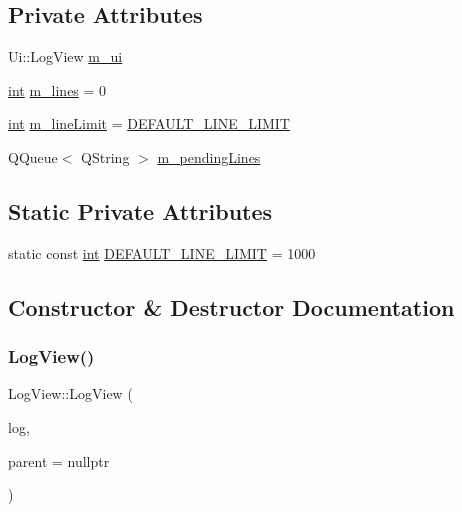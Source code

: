 \subsection*{Private Attributes}
\begin{DoxyCompactItemize}
\item 
Ui\+::\+Log\+View \mbox{\hyperlink{class_q_g_b_a_1_1_log_view_ad14d2319c553761effb0dcfa47ead0b3}{m\+\_\+ui}}
\item 
\mbox{\hyperlink{ioapi_8h_a787fa3cf048117ba7123753c1e74fcd6}{int}} \mbox{\hyperlink{class_q_g_b_a_1_1_log_view_af520c8df95517a41cf269ba91be23a15}{m\+\_\+lines}} = 0
\item 
\mbox{\hyperlink{ioapi_8h_a787fa3cf048117ba7123753c1e74fcd6}{int}} \mbox{\hyperlink{class_q_g_b_a_1_1_log_view_a7500c6dca5556014b72ad664fe8b5700}{m\+\_\+line\+Limit}} = \mbox{\hyperlink{class_q_g_b_a_1_1_log_view_a7bbb7148e2dca4f2ac6b25d8def4b196}{D\+E\+F\+A\+U\+L\+T\+\_\+\+L\+I\+N\+E\+\_\+\+L\+I\+M\+IT}}
\item 
Q\+Queue$<$ Q\+String $>$ \mbox{\hyperlink{class_q_g_b_a_1_1_log_view_a77842da472ca74e8b5b54ea865beaf17}{m\+\_\+pending\+Lines}}
\end{DoxyCompactItemize}
\subsection*{Static Private Attributes}
\begin{DoxyCompactItemize}
\item 
static const \mbox{\hyperlink{ioapi_8h_a787fa3cf048117ba7123753c1e74fcd6}{int}} \mbox{\hyperlink{class_q_g_b_a_1_1_log_view_a7bbb7148e2dca4f2ac6b25d8def4b196}{D\+E\+F\+A\+U\+L\+T\+\_\+\+L\+I\+N\+E\+\_\+\+L\+I\+M\+IT}} = 1000
\end{DoxyCompactItemize}


\subsection{Constructor \& Destructor Documentation}
\mbox{\label{class_q_g_b_a_1_1_log_view_a7bccf99af2ec77e478716a72b8b790e5}} 
\subsubsection{\texorpdfstring{Log\+View()}{LogView()}}
{\footnotesize\ttfamily Log\+View\+::\+Log\+View (\begin{DoxyParamCaption}\item[{\mbox{\hyperlink{class_q_g_b_a_1_1_log_controller}{Log\+Controller}} $\ast$}]{log,  }\item[{Q\+Widget $\ast$}]{parent = {\ttfamily nullptr} }\end{DoxyParamCaption})}

